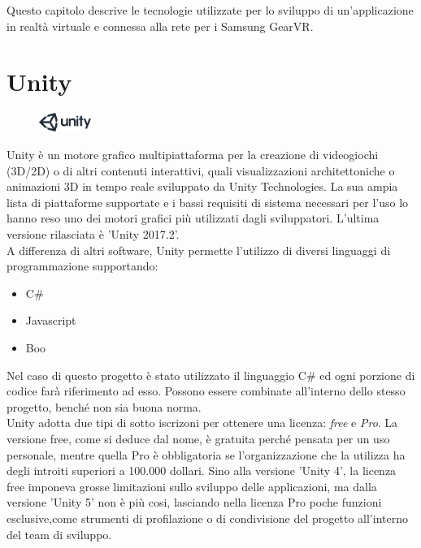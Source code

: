 Questo capitolo descrive le tecnologie utilizzate per lo sviluppo di un'applicazione in realtà virtuale e connessa alla rete per i Samsung GearVR.\\

\section{Unity}
\begin{figure} %
	\centering
	\includegraphics[width=0.15\textwidth]{figure/UnityLogo}
\end{figure}
Unity è un motore grafico multipiattaforma per la creazione di videogiochi (3D/2D) o di altri contenuti interattivi, quali visualizzazioni architettoniche o animazioni 3D in tempo reale sviluppato da Unity Technologies.\cite{UnityDesc}
La sua ampia lista di piattaforme supportate \cite{UnityPlat} e i bassi requisiti di sistema necessari per l'uso \cite{UnityReq} lo hanno reso uno dei motori grafici più utilizzati dagli sviluppatori. L'ultima versione rilasciata è 'Unity 2017.2'. \\
A differenza di altri software, Unity permette l'utilizzo di diversi linguaggi di programmazione supportando:
\begin{itemize}
	\item C\#
	\item Javascript
	\item Boo
\end{itemize}
Nel caso di questo progetto è stato utilizzato il linguaggio C\# ed ogni porzione di codice farà riferimento ad esso.
Possono essere combinate all'interno dello stesso progetto, benché non sia buona norma. \\
Unity adotta due tipi di sotto iscrizoni per ottenere una licenza: \textit{free} e \textit{Pro}. La versione free, come si deduce dal nome, è gratuita perché pensata per un uso personale, mentre quella Pro è obbligatoria se l'organizzazione che la utilizza ha degli introiti superiori a 100.000 dollari.
Sino alla versione 'Unity 4', la licenza free imponeva grosse limitazioni sullo sviluppo delle applicazioni, ma dalla versione 'Unity 5' non è più cosi, lasciando nella licenza Pro poche funzioni esclusive,come strumenti di profilazione o di condivisione del progetto all'interno del team di sviluppo.  

